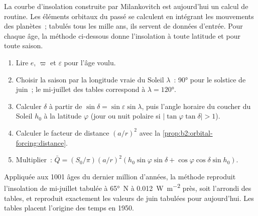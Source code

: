 La courbe d'insolation construite par Milankovitch est aujourd'hui un calcul de routine. Les éléments orbitaux
du passé se calculent en intégrant les mouvements des planètes~; tabulés tous les mille ans,
ils servent de données d'entrée. Pour chaque âge, la méthode ci-dessous donne l'insolation à toute latitude et pour toute saison.

\begin{method}\label{met:b2:orbital-forcing:curve}
\begin{enumerate}
  \item Lire $e$, $\varpi$ et $\varepsilon$ pour l'âge voulu.
  \item Choisir la saison par la longitude vraie du Soleil $\lambda$~: \ang{90} pour le solstice de juin~;
        le mi-juillet des tables correspond à $\lambda = \ang{120}$.
  \item Calculer $\delta$ à partir de $\sin\delta = \sin\varepsilon\sin\lambda$, puis l'angle horaire du
        coucher du Soleil $h_0$ à la latitude $\varphi$ (jour ou nuit polaire si $|\tan\varphi\tan\delta| > 1$).
  \item Calculer le facteur de distance $(a/r)^2$ avec la \cref{prop:b2:orbital-forcing:distance}.
  \item Multiplier~: $\bar Q = (S_0/\pi)(a/r)^2(h_0\sin\varphi\sin\delta +
        \cos\varphi\cos\delta\sin h_0)$.
\end{enumerate}
\end{method}

Appliquée aux 1001 âges du dernier million d'années, la méthode reproduit l'insolation de mi-juillet tabulée
à \ang{65}~N à \qty{0.012}{W.m^{-2}} près, soit l'arrondi des tables, et reproduit exactement les valeurs de juin
tabulées pour aujourd'hui. Les tables placent l'origine des temps en 1950.


